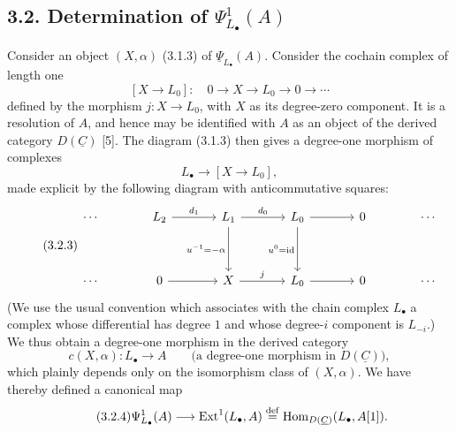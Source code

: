 
\subsection*{3.2. Determination of $\Psi^1_{L_\bullet}(A)$}

Consider an object $(X,\alpha)$ (3.1.3) of
$\underline\Psi_{L_\bullet}(A)$. Consider the cochain complex of
length one
\begin{equation}\tag{3.2.1}
 [X\longrightarrow L_0]:\quad
 0\longrightarrow X\longrightarrow L_0\longrightarrow0\longrightarrow
 \cdots
\end{equation}
defined by the morphism $j:X\longrightarrow L_0$, with $X$ as its
degree-zero component. It is a resolution of $A$, and hence may be
identified with $A$ as an object of the derived category
$D(\underline C)$ [5]. The diagram (3.1.3) then gives a degree-one
morphism of complexes
\begin{equation}\tag{3.2.2}
 L_\bullet\longrightarrow[X\longrightarrow L_0],
\end{equation}
made explicit by the following diagram with anticommutative squares:
\begin{equation}\tag{3.2.3}
\begin{tikzcd}[column sep=large,row sep=huge]
 \cdots & L_2\arrow[r,"d_1"]
 & L_1\arrow[r,"d_0"]\arrow[d,"u^{-1}=-\alpha"']
 & L_0\arrow[r]\arrow[d,"u^0=\mathrm{id}"'] & 0 & \cdots\\
 \cdots & 0\arrow[r] & X\arrow[r,"j"] & L_0\arrow[r] & 0 & \cdots
\end{tikzcd}
\end{equation}
(We use the usual convention which associates with the chain complex
$L_\bullet$ a complex whose differential has degree $1$ and whose
degree-$i$ component is $L_{-i}$.) We thus obtain a degree-one
morphism in the derived category
\begin{equation}\tag{3.2.3}
 c(X,\alpha):L_\bullet\longrightarrow A
 \qquad
 \bigl(\text{a degree-one morphism in }D(\underline C)\bigr),
\end{equation}
which plainly depends only on the isomorphism class of $(X,\alpha)$.
We have thereby defined a canonical map
\begin{equation}\tag{3.2.4}
 \Psi^1_{L_\bullet}(A)\longrightarrow\Ext^1(L_\bullet,A)
 \overset{\mathrm{def}}{=}
 \Hom_{D(\underline C)}(L_\bullet,A[1]).
\end{equation}

